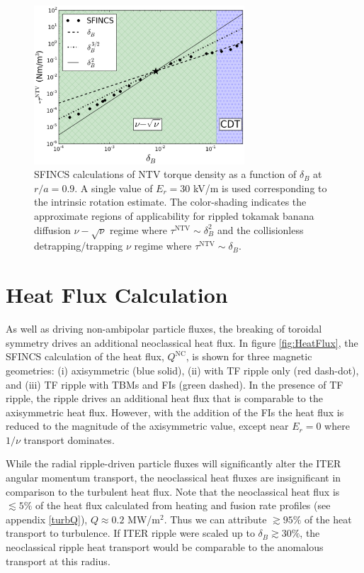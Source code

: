 \documentclass[aip, pop, preprint]{revtex4-1}
\numberwithin{figure}{section}
\numberwithin{equation}{section}
\begin{document}
\begin{figure}[h!]
\centering
\includegraphics[width=0.7\textwidth]{figure11.eps}
\caption{\label{fig:scalescan} SFINCS calculations of NTV torque density as a function of $\delta_B$ at $r/a = 0.9$. A single value of $E_r = 30$ kV/m is used corresponding to the intrinsic rotation estimate. The color-shading indicates the approximate regions of applicability for rippled tokamak banana diffusion $\nu-\sqrt{\nu}$ regime\cite{Shaing2008} where $\tau^{\mathrm{NTV}} \sim \delta_B^2$ and the collisionless detrapping/trapping $\nu$ regime\cite{Shaing2009} where $\tau^{\mathrm{NTV}} \sim \delta_B$.}
\end{figure} 

\FloatBarrier

\section{Heat Flux Calculation}\label{heatflux}
As well as driving non-ambipolar particle fluxes, the breaking of toroidal symmetry drives an additional neoclassical heat flux. In figure \ref{fig:HeatFlux}, the SFINCS calculation of the heat flux, $Q^{\mathrm{NC}}$, is shown for three magnetic geometries: (i) axisymmetric (blue solid), (ii) with TF ripple only (red dash-dot), and (iii) TF ripple with TBMs and FIs (green dashed). In the presence of TF ripple, the ripple drives an additional heat flux that is comparable to the axisymmetric heat flux. However, with the addition of the FIs the heat flux is reduced to the magnitude of the axisymmetric value, except near $E_r = 0$ where $1/\nu$ transport dominates. 

While the radial ripple-driven particle fluxes will significantly alter the ITER angular momentum transport, the neoclassical heat fluxes are insignificant in comparison to the turbulent heat flux. Note that the neoclassical heat flux is $\lesssim 5\%$  of the heat flux calculated from heating and fusion rate profiles (see appendix \ref{turbQ}), $Q\approx 0.2$ MW/m$^2$. Thus we can attribute $\gtrsim 95\%$ of the heat transport to turbulence. If ITER ripple were scaled up to $\delta_B \gtrsim 30\%$, the neoclassical ripple heat transport would be comparable to the anomalous transport at this radius.
\end{document}

